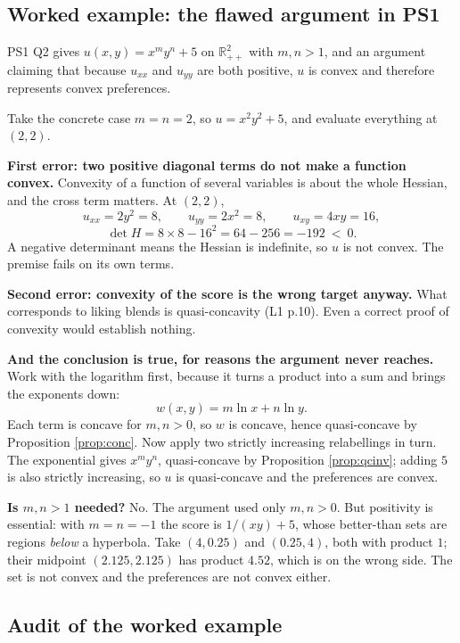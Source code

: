 \documentclass[11pt,letterpaper]{article}
\theoremstyle{definition}
\theoremstyle{plain}
\newcommand{\src}[1]{{\small\textsf{(#1)}}}
\begin{document}
\subsection{Worked example: the flawed argument in PS1}

PS1 Q2 gives $u(x,y) = x^m y^n + 5$ on $\mathbb{R}^2_{++}$ with $m, n > 1$, and an argument claiming
that because $u_{xx}$ and $u_{yy}$ are both positive, $u$ is convex and therefore represents convex
preferences.

Take the concrete case $m = n = 2$, so $u = x^2 y^2 + 5$, and evaluate everything at $(2,2)$.

\textbf{First error: two positive diagonal terms do not make a function convex.} Convexity of a
function of several variables is about the whole Hessian, and the cross term matters. At $(2,2)$,
\[
u_{xx} = 2y^2 = 8, \qquad u_{yy} = 2x^2 = 8, \qquad u_{xy} = 4xy = 16,
\]
\[
\det H = 8 \times 8 - 16^2 = 64 - 256 = -192 \ < \ 0 .
\]
A negative determinant means the Hessian is indefinite, so $u$ is not convex. The premise fails on
its own terms.

\textbf{Second error: convexity of the score is the wrong target anyway.} What corresponds to liking
blends is quasi-concavity \src{L1 p.10}. Even a correct proof of convexity would establish nothing.

\textbf{And the conclusion is true, for reasons the argument never reaches.} Work with the logarithm
first, because it turns a product into a sum and brings the exponents down:
\[
w(x,y) = m \ln x + n \ln y .
\]
Each term is concave for $m, n > 0$, so $w$ is concave, hence quasi-concave by Proposition
\ref{prop:conc}. Now apply two strictly increasing relabellings in turn. The exponential gives
$x^m y^n$, quasi-concave by Proposition \ref{prop:qcinv}; adding $5$ is also strictly increasing, so
$u$ is quasi-concave and the preferences are convex.

\textbf{Is $m, n > 1$ needed?} No. The argument used only $m, n > 0$. But positivity is essential:
with $m = n = -1$ the score is $1/(xy) + 5$, whose better-than sets are regions \emph{below} a
hyperbola. Take $(4, 0.25)$ and $(0.25, 4)$, both with product $1$; their midpoint $(2.125, 2.125)$
has product $4.52$, which is on the wrong side. The set is not convex and the preferences are not
convex either.

\subsection{Audit of the worked example}
\end{document}
